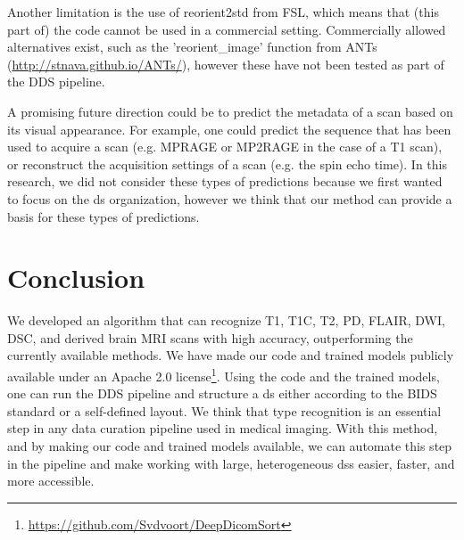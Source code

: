 Another limitation is the use of reorient2std from FSL, which means that (this part of) the code cannot be used in a commercial setting.
Commercially allowed alternatives exist, such as the 'reorient\_image' function from ANTs (\url{http://stnava.github.io/ANTs/}), however these have not been tested as part of the \gls{DDS} pipeline.

A promising future direction could be to predict the metadata of a \gls{scan} based on its visual appearance.
For example, one could predict the sequence that has been used to acquire a \gls{scan} (e.g. MPRAGE or MP2RAGE in the case of a \gls{T1} \gls{scan}), or reconstruct the acquisition settings of a \gls{scan} (e.g. the spin echo time).
In this research, we did not consider these types of predictions because we first wanted to focus on the \gls{ds} organization, however we think that our method can provide a basis for these types of predictions.

\section{Conclusion}

We developed an algorithm that can recognize \gls{T1}, \gls{T1C}, \gls{T2}, \gls{PD}, \gls{FLAIR}, \gls{DWI}, \gls{DSC}, and derived brain \gls{MRI} \glspl{scan} with high accuracy, outperforming the currently available methods.
We have made our code and trained models publicly available under an Apache 2.0 license\footnote{\url{https://github.com/Svdvoort/DeepDicomSort}}.
Using the code and the trained models, one can run the \gls{DDS} pipeline and structure a \gls{ds} either according to the \gls{BIDS} standard or a self-defined layout.
We think that \gls{type} recognition is an essential step in any data curation pipeline used in medical imaging.
With this method, and by making our code and trained models available, we can automate this step in the pipeline and make working with large, heterogeneous \glspl{ds} easier, faster, and more accessible.

